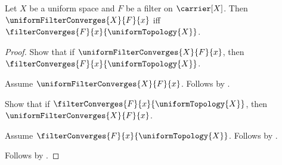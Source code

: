\begin{theorem}\label{uniform_filter_convergence_iff_topological}
    Let $X$ be a uniform space and $F$ be a filter on $\carrier[X]$.
    Then $\uniformFilterConverges{X}{F}{x}$ iff
        $\filterConverges{F}{x}{\uniformTopology{X}}$.
\end{theorem}
\begin{proof}
    Show that if $\uniformFilterConverges{X}{F}{x}$, then
        $\filterConverges{F}{x}{\uniformTopology{X}}$.
    \begin{subproof}
        Assume $\uniformFilterConverges{X}{F}{x}$.
        Follows by .
    \end{subproof}
    Show that if $\filterConverges{F}{x}{\uniformTopology{X}}$, then
        $\uniformFilterConverges{X}{F}{x}$.
    \begin{subproof}
        Assume $\filterConverges{F}{x}{\uniformTopology{X}}$.
        Follows by .
    \end{subproof}
    Follows by \auto.
\end{proof}

